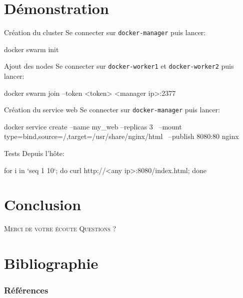 \documentclass{cubeamer}
\begin{document}
\section{Démonstration}

\begin{frame}[fragile]{Création du cluster}
Se connecter sur \verb:docker-manager: puis lancer:
\begin{bash}
docker swarm init
\end{bash}
\end{frame}

\begin{frame}[fragile]{Ajout des nodes}
Se connecter sur \verb:docker-worker1: et \verb:docker-worker2: puis lancer:
\begin{bash}
docker swarm join --token <token> <manager ip>:2377
\end{bash}
\end{frame}

\begin{frame}[fragile]{Création du service web}
Se connecter sur \verb:docker-manager: puis lancer:
\begin{bash}
docker service create --name my_web --replicas 3 \
    --mount type=bind,source=/,target=/usr/share/nginx/html \
    --publish 8080:80 nginx
\end{bash}
\end{frame}

\begin{frame}[fragile]{Tests}
Depuis l'hôte:
\begin{bash}
for i in `seq 1 10`; do curl http://<any ip>:8080/index.html; done
\end{bash}
\end{frame}


\section{Conclusion}

\begin{frame}[standout]
    \Huge\textsc{Merci de votre écoute}
    \vfill
    \LARGE\textsc{Questions ?}
\end{frame}

\section*{Bibliographie}

\begin{frame}[allowframebreaks]
    \frametitle{Références}
    \nocite{*}
    
    
\end{frame}
\end{document}
